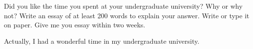 Did you like the time you spent at your undergraduate university? Why or why not? Write an essay of at least 200 words to explain your answer. Write or type it on paper. Give me you essay within two weeks.



Actually, I had a wonderful time in my undergraduate university.
